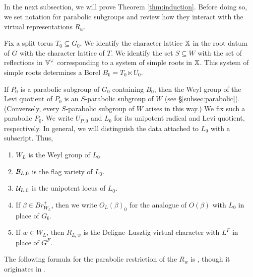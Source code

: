 \documentclass[a4paper,10pt,leqno]{amsart}
\theoremstyle{plain}
\theoremstyle{plain}
\theoremstyle{plain}
\theoremstyle{definition}
\theoremstyle{remark}
\newcommand{\Br}{\mathit{Br}}
\begin{document}
\subsection{}

In the next subsection, we will prove Theorem \ref{thm:induction}.
Before doing so, we set notation for parabolic subgroups and review how they interact with the virtual representations $R_w$.

Fix a split torus $T_0 \subseteq G_0$.
We identify the character lattice $\bb{X}$ in the root datum of $G$ with the character lattice of $T$.
We identify the set $S \subseteq W$ with the set of reflections in $\bb{V}^\vee$ corresponding to a system of simple roots in $\bb{X}$.
This system of simple roots determines a Borel $B_0 = T_0 \ltimes U_0$.

If $P_0$ is a parabolic subgroup of $G_0$ containing $B_0$, then the Weyl group of the Levi quotient of $P_0$ is an $S$-parabolic subgroup of $W$ (see \S\ref{subsec:parabolic}).
(Conversely, every $S$-parabolic subgroup of $W$ arises in this way.)
We fix such a parabolic $P_0$.
We write $U_{P, 0}$ and $L_0$ for its unipotent radical and Levi quotient, respectively.
In general, we will distinguish the data attached to $L_0$ with a subscript.
Thus,
\begin{enumerate}
\item 	$W_L$ is the Weyl group of $L_0$.
\item 	$\cal{B}_{L, 0}$ is the flag variety of $L_0$.
\item 	$\cal{U}_{L, 0}$ is the unipotent locus of $L_0$.
\item 	If $\beta \in \Br_{W_L}^+$, then we write $O_L(\beta)_0$ for the analogue of $O(\beta)$ with $L_0$ in place of $G_0$.
\item 	If $w \in W_L$, then $R_{L, w}$ is the Deligne--Lusztig virtual character with $L^F$ in place of $G^F$.
\end{enumerate}
The following formula for the parabolic restriction of the $R_w$ is \cite[Prop.\ 7.4.4]{carter}, though it originates in \cite[\S{8}]{dl}.

\end{document}
